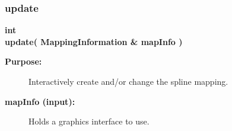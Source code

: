 \subsubsection{update}
 
\begin{flushleft} \textbf{%
int  \\ 
\settowidth{\SplineMappingIncludeArgIndent}{update(}%
update( MappingInformation \& mapInfo ) 
}\end{flushleft}
\begin{description}
\item[{\bf Purpose:}]  Interactively create and/or change the spline mapping.
\item[{\bf mapInfo (input):}]  Holds a graphics interface to use.
\end{description}
